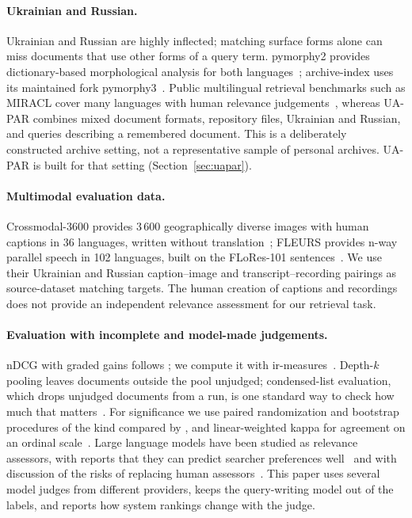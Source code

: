 \paragraph{Ukrainian and Russian.}
Ukrainian and Russian are highly inflected; matching surface forms alone can miss documents that use other forms of a query term. pymorphy2 provides dictionary-based morphological analysis for both languages~\citep{korobov2015pymorphy}; archive-index uses its maintained fork pymorphy3~\citep{pymorphy3}. Public multilingual retrieval benchmarks such as MIRACL cover many languages with human relevance judgements~\citep{zhang2023miracl}, whereas UA-PAR combines mixed document formats, repository files, Ukrainian and Russian, and queries describing a remembered document. This is a deliberately constructed archive setting, not a representative sample of personal archives. UA-PAR is built for that setting (Section~\ref{sec:uapar}).

\paragraph{Multimodal evaluation data.}
Crossmodal-3600 provides 3\,600 geographically diverse images with human captions in 36 languages, written without translation~\citep{thapliyal2022xm3600}; FLEURS provides n-way parallel speech in 102 languages, built on the FLoRes-101 sentences~\citep{conneau2023fleurs}. We use their Ukrainian and Russian caption--image and transcript--recording pairings as source-dataset matching targets. The human creation of captions and recordings does not provide an independent relevance assessment for our retrieval task.

\paragraph{Evaluation with incomplete and model-made judgements.}
nDCG with graded gains follows \citet{jarvelin2002ndcg}; we compute it with ir-measures~\citep{macavaney2022irmeasures}. Depth-$k$ pooling leaves documents outside the pool unjudged; condensed-list evaluation, which drops unjudged documents from a run, is one standard way to check how much that matters~\citep{sakai2007bpref}. For significance we use paired randomization and bootstrap procedures of the kind compared by \citet{smucker2007significance}, and linear-weighted kappa for agreement on an ordinal scale~\citep{cohen1968kappa}. Large language models have been studied as relevance assessors, with reports that they can predict searcher preferences well~\citep{thomas2024llmjudge} and with discussion of the risks of replacing human assessors~\citep{faggioli2023perspectives}. This paper uses several model judges from different providers, keeps the query-writing model out of the labels, and reports how system rankings change with the judge.

